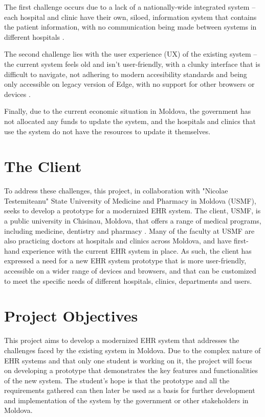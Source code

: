 The first challenge occurs due to a lack of a nationally-wide integrated system -- each hospital and clinic have their own, siloed, information system that contains the patient information, with no communication being made between systems in different hospitals \parencite{mdehr}. 

The second challenge lies with the user experience (UX) of the existing system -- the current system feels old and isn't user-friendly, with a clunky interface that is difficult to navigate, not adhering to modern accesibility standards and being only accessible on legacy version of Edge, with no support for other browsers or devices \parencite{mdehr}. 

Finally, due to the current economic situation in Moldova, the government has not allocated any funds to update the system, and the hospitals and clinics that use the system do not have the resources to update it themselves. 

\section{The Client}

To address these challenges, this project, in collaboration with "Nicolae Testemiteanu" State University of Medicine and Pharmacy in Moldova (USMF), seeks to develop a prototype for a modernized EHR system. The client, USMF, is a public university in Chisinau, Moldova, that offers a range of medical programs, including medicine, dentistry and pharmacy \parencite{mduni}. Many of the faculty at USMF are also practicing doctors at hospitals and clinics across Moldova, and have first-hand experience with the current EHR system in place. As such, the client has expressed a need for a new EHR system prototype that is more user-friendly, accessible on a wider range of devices and browsers, and that can be customized to meet the specific needs of different hospitals, clinics, departments and users.

\section{Project Objectives}

This project aims to develop a modernized EHR system that addresses the challenges faced by the existing system in Moldova. Due to the complex nature of EHR systems and that only one student is working on it, the project will focus on developing a prototype that demonstrates the key features and functionalities of the new system. The student's hope is that the prototype and all the requirements gathered can then later be used as a basis for further development and implementation of the system by the government or other stakeholders in Moldova.

